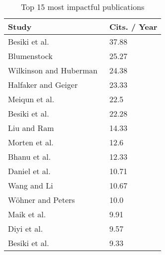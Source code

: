 \begin{table}[htbp]
    \caption{Top 15 most impactful publications}
    \label{tab:impactful}
    \centering
    \begin{tabular}{l l}
        \toprule
        \textbf{Study} & \textbf{Cits. / Year} \\
        \midrule
        Besiki et al.~\cite{Stvilia2007_lr1012} & 37.88 \\
        Blumenstock~\cite{Blumenstock2008_lr4} & 25.27 \\
        Wilkinson and Huberman~\cite{Wilkinson2007_lr2} & 24.38 \\
        Halfaker and Geiger~\cite{Halfaker2020_lr1055} & 23.33 \\
        Meiqun et al.~\cite{Hu2007_lr1} & 22.5 \\
        Besiki et al.~\cite{Stvilia2005_lr1013} & 22.28 \\
        Liu and Ram~\cite{Liu2011_lr3} & 14.33 \\
        Morten et al.~\cite{Warncke-Wang2013_lr13} & 12.6 \\
        Bhanu et al.~\cite{Guda2020_lr38} & 12.33 \\
        Daniel et al.~\cite{Dalip2009_lr14} & 10.71 \\
        Wang and Li~\cite{Wang2020_lr26} & 10.67 \\
        Wöhner and Peters~\cite{Wohner2009_lr10} & 10.0 \\
        Maik et al.~\cite{Anderka2012_lr17} & 9.91 \\
        Diyi et al.~\cite{Yang2016_lr2001} & 9.57 \\
        Besiki et al.~\cite{Stvilia2005_lr12} & 9.33 \\
        \bottomrule
    \end{tabular}
\end{table}
